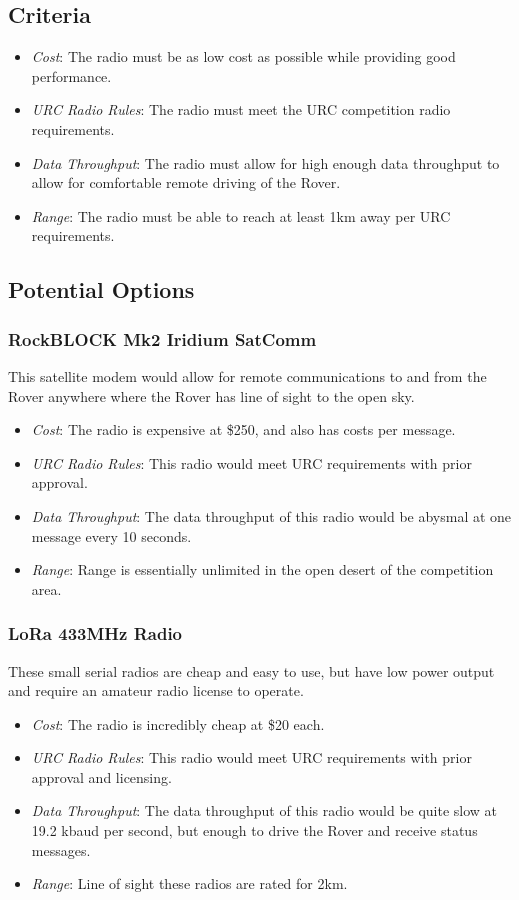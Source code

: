 \documentclass[onecolumn, draftclsnofoot, 10pt, compsoc]{IEEEtran}
\begin{document}
\subsection{Criteria}
\begin{itemize}
\item \textit{Cost}: The radio must be as low cost as possible while providing good performance.
\item \textit{URC Radio Rules}: The radio must meet the URC competition radio requirements.
\item \textit{Data Throughput}: The radio must allow for high enough data throughput to allow for comfortable remote driving of the Rover.
\item \textit{Range}: The radio must be able to reach at least 1km away per URC requirements.
\end{itemize}

\subsection{Potential Options}
\subsubsection{RockBLOCK Mk2 Iridium SatComm}
This satellite modem would allow for remote communications to and from the Rover anywhere where the Rover has line of sight to the open sky.

\begin{itemize}
\item \textit{Cost}: The radio is expensive at \$250, and also has costs per message.
\item \textit{URC Radio Rules}: This radio would meet URC requirements with prior approval.
\item \textit{Data Throughput}: The data throughput of this radio would be abysmal at one message every 10 seconds. 
\item \textit{Range}: Range is essentially unlimited in the open desert of the competition area.
\end{itemize}

\subsubsection{LoRa 433MHz Radio}
These small serial radios are cheap and easy to use, but have low power output and require an amateur radio license to operate.

\begin{itemize}
\item \textit{Cost}: The radio is incredibly cheap at \$20 each.
\item \textit{URC Radio Rules}: This radio would meet URC requirements with prior approval and licensing.
\item \textit{Data Throughput}: The data throughput of this radio would be quite slow at 19.2 kbaud per second, but enough to drive the Rover and receive status messages.
\item \textit{Range}: Line of sight these radios are rated for 2km.
\end{itemize}
\end{document}
